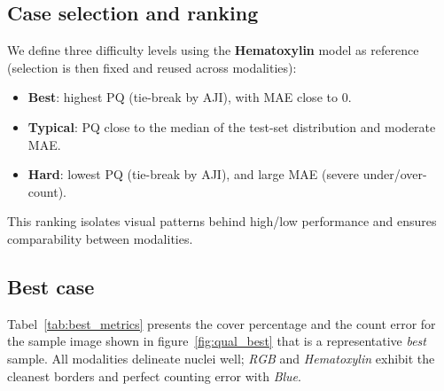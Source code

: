 \documentclass[target=bach,aauheader=,style=]{thud}
\begin{document}
\subsection{Case selection and ranking}
We define three difficulty levels using the \textbf{Hematoxylin} model as reference (selection is then fixed and reused across modalities):
\begin{itemize}
  \item \textbf{Best}: highest PQ (tie-break by AJI), with MAE close to $0$.
  \item \textbf{Typical}: PQ close to the median of the test-set distribution and moderate MAE.
  \item \textbf{Hard}: lowest PQ (tie-break by AJI), and large MAE (severe under/over-count).
\end{itemize}
This ranking isolates visual patterns behind high/low performance and ensures comparability between modalities.


\subsection{Best case}
Tabel~\ref{tab:best_metrics} presents the cover percentage and the count error for the sample image shown in figure~\ref{fig:qual_best} that is a representative \emph{best} sample. All modalities delineate nuclei well; \emph{RGB} and \emph{Hematoxylin} exhibit the cleanest borders and perfect counting error with \emph{Blue}.
\end{document}
